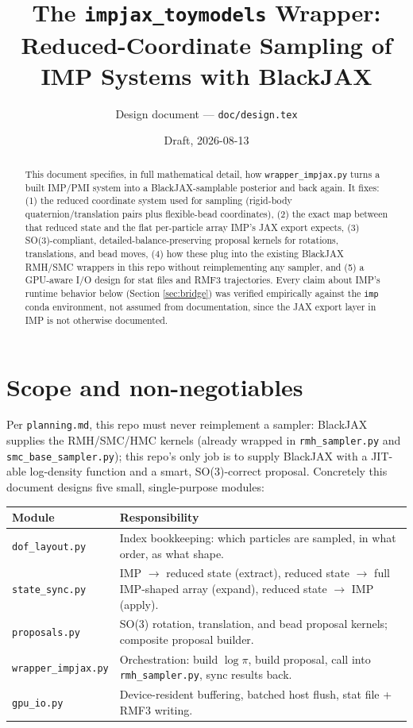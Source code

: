 \documentclass[11pt]{article}
\title{The \texttt{impjax\_toymodels} Wrapper:\\
Reduced-Coordinate Sampling of IMP Systems with BlackJAX}
\author{Design document --- \texttt{doc/design.tex}}
\date{Draft, 2026-08-13}
\begin{document}
\maketitle

\begin{abstract}
This document specifies, in full mathematical detail, how \texttt{wrapper\_impjax.py}
turns a built IMP/PMI system into a BlackJAX-samplable posterior and back again.
It fixes: (1) the reduced coordinate system used for sampling (rigid-body
quaternion/translation pairs plus flexible-bead coordinates), (2) the exact
map between that reduced state and the flat per-particle array IMP's JAX
export expects, (3) SO(3)-compliant, detailed-balance-preserving proposal
kernels for rotations, translations, and bead moves, (4) how these plug into
the existing BlackJAX RMH/SMC wrappers in this repo without reimplementing
any sampler, and (5) a GPU-aware I/O design for stat files and RMF3
trajectories. Every claim about IMP's runtime behavior below (Section
\ref{sec:bridge}) was verified empirically against the \texttt{imp} conda
environment, not assumed from documentation, since the JAX export layer in
IMP is not otherwise documented.
\end{abstract}

\tableofcontents

\section{Scope and non-negotiables}
\label{sec:scope}

Per \texttt{planning.md}, this repo must never reimplement a sampler: BlackJAX
supplies the RMH/SMC/HMC kernels (already wrapped in \texttt{rmh\_sampler.py}
and \texttt{smc\_base\_sampler.py}); this repo's only job is to supply BlackJAX
with a JIT-able log-density function and a smart, SO(3)-correct proposal.
Concretely this document designs five small, single-purpose modules:

\begin{center}
\begin{tabular}{@{}l p{9.5cm}@{}}
\toprule
Module & Responsibility \\
\midrule
\texttt{dof\_layout.py} & Index bookkeeping: which particles are sampled, in what order, as what shape. \\
\texttt{state\_sync.py} & IMP $\to$ reduced state (extract), reduced state $\to$ full IMP-shaped array (expand), reduced state $\to$ IMP (apply). \\
\texttt{proposals.py} & SO(3) rotation, translation, and bead proposal kernels; composite proposal builder. \\
\texttt{wrapper\_impjax.py} & Orchestration: build $\log\pi$, build proposal, call into \texttt{rmh\_sampler.py}, sync results back. \\
\texttt{gpu\_io.py} & Device-resident buffering, batched host flush, stat file + RMF3 writing. \\
\bottomrule
\end{tabular}
\end{center}
\end{document}
